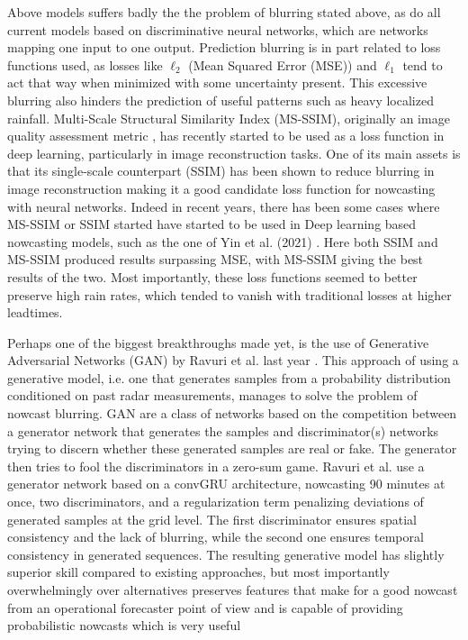 Above models suffers badly the the problem of blurring stated above, as do all current models based on discriminative neural networks, which are networks mapping one input to one output. Prediction blurring is in part related to loss functions used, as losses like $\ell_2$ (Mean Squared Error (MSE)) and $\ell_1$ tend to act that way when minimized with some uncertainty present. This excessive blurring also hinders the prediction of useful patterns such as heavy localized rainfall.
Multi-Scale Structural Similarity Index (MS-SSIM), originally an image quality assessment metric \cite{wang_multiscale_2003}, has recently started to be used as a loss function in deep learning, particularly in image reconstruction tasks. One of its main assets is that its single-scale counterpart (SSIM) has been shown to reduce blurring in image reconstruction \cite{zhao_loss_2017} making it a good candidate loss function for nowcasting with neural networks.  Indeed in recent years, there has been some cases where MS-SSIM or SSIM started have started to be used in Deep learning based nowcasting models, such as the one of Yin et al. (2021) \cite{yin_application_2021}. Here both SSIM and MS-SSIM produced results surpassing MSE, with MS-SSIM giving the best results of the two. Most importantly, these loss functions seemed to better preserve high rain rates, which tended to vanish with traditional losses at higher leadtimes. 

Perhaps one of the biggest breakthroughs made yet, is the use of Generative Adversarial Networks (GAN) by Ravuri et al. last year \cite{ravuri_skilful_2021}. This approach of using a generative model, i.e. one that generates samples from a probability distribution conditioned on past radar measurements, manages to solve the problem of nowcast blurring. GAN are a class of networks based on the competition between a generator network that generates the samples and discriminator(s) networks trying to discern whether these generated samples are real or fake. The generator then tries to fool the discriminators in a zero-sum game. Ravuri et al. use a generator network based on a convGRU architecture, nowcasting 90 minutes at once, two discriminators, and a regularization term penalizing deviations of generated samples at the grid level. The first discriminator ensures spatial consistency and the lack of blurring, while the second one ensures temporal consistency in generated sequences. The resulting generative model has slightly superior skill compared to existing approaches, but most importantly overwhelmingly over alternatives preserves features that make for a good nowcast from an operational forecaster point of view and is capable of providing probabilistic nowcasts which is very useful \cite{ravuri_skilful_2021}

